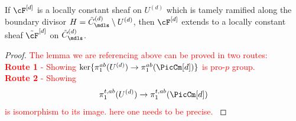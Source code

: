 \begin{lemma}\label{lemma:ExtensionOfTamelyRamifiedSheaf}
    If $\cF^{[d]}$ is a locally constant sheaf on $U^{(d)}$ which is tamely ramified along the boundary divisor $H = \tilde{C}^{(d)}_\mdls \setminus U^{(d)}$, 
    then $\cF^{[d]}$ extends to a locally constant sheaf $\tilde{\cF}^{[d]}$ on $\tilde{C}^{(d)}_\mdls$.
\end{lemma}
\begin{proof}
    \textcolor{red}{The lemma we are referencing above can be proved in two routes:
\\
\textbf{Route 1} - Showing $ \ker \{\pi^{ab}_1(U^{(d)}) \to \pi^{ab}_1(\PicCm[d]) \} $ is pro-$p$ group. \\
\textbf{Route 2} - Showing $$\pi^{t, ab}_1(U^{(d)}) \to \pi^{t,ab}_1(\PicCm[d])$$ is isomorphism to its image.  \textcolor{red}{here one needs to be precise.}
}

\end{proof}

